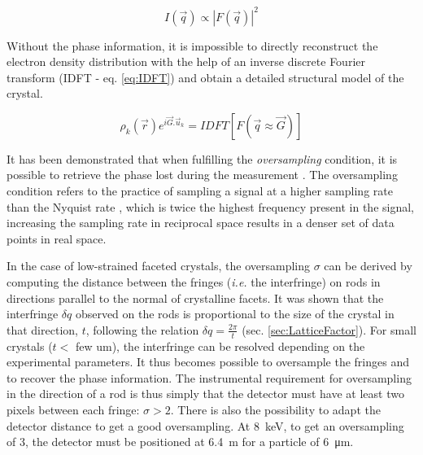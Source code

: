 \begin{equation}
    \label{eq:DetectorIntensity}
    I(\vec{q}) \propto |F(\vec{q})|^2
\end{equation}

Without the phase information, it is impossible to directly reconstruct the electron density distribution with the help of an inverse discrete Fourier transform (IDFT - eq. \ref{eq:IDFT}) and obtain a detailed structural model of the crystal.

\begin{equation}
    \label{eq:IDFT}
    \rho_k(\vec{r}) e^{i\vec{G}.\vec{u}_k} = IDFT [F(\vec{q} \approx \vec{G})]
\end{equation}

It has been demonstrated that when fulfilling the \textit{oversampling} condition, it is possible to retrieve the phase lost during the measurement \parencite{Shannon1949, Sayre1952}.
The oversampling condition refers to the practice of sampling a signal at a higher sampling rate than the Nyquist rate \parencite{Miao2000}, which is twice the highest frequency present in the signal, increasing the sampling rate in reciprocal space results in a denser set of data points in real space.

In the case of low-strained faceted crystals, the oversampling $\sigma$ can be derived by computing the distance between the fringes (\textit{i.e.} the interfringe) on rods in directions parallel to the normal of crystalline facets.
It was shown that the interfringe $\delta q$ observed on the rods is proportional to the size of the crystal in that direction, $t$, following the relation $\delta q = \frac{2\pi}{t}$ (sec. \ref{sec:LatticeFactor}).
For small crystals ($t<$ few \unit{um}), the interfringe can be resolved depending on the experimental parameters.
It thus becomes possible to oversample the fringes and to recover the phase information.
The instrumental requirement for oversampling in the direction of a rod is thus simply that the detector must have at least two pixels between each fringe: $\sigma >2$.
There is also the possibility to adapt the detector distance to get a good oversampling.
At \qty{8}{\keV}, to get an oversampling of 3, the detector must be positioned at \qty{6.4}{\m} for a particle of \qty{6}{\um}.

